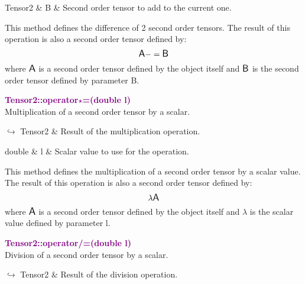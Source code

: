 \begin{tcolorbox}[width=\textwidth,myArgs,tabularx={ll|R}]
Tensor2 & B & Second order tensor to add to the current one.
\end{tcolorbox}

This method defines the difference of 2 second order tensors.
The result of this operation is also a second order tensor defined by:
\begin{equation*}
\mbox{\large\ensuremath{\mathsf{A}}} -= \mbox{\large\ensuremath{\mathsf{B}}}
\end{equation*}
where $\mbox{\large\ensuremath{\mathsf{A}}}$ is a second order tensor defined by the object itself and $\mbox{\large\ensuremath{\mathsf{B}}}$ is the second order tensor defined by parameter B.

\textcolor{purple}{\textbf{Tensor2::operator$\star$=(double l)}}\label{Tensor2::operator*=(double l)}\\
Multiplication of a second order tensor by a scalar.\vspace*{-0.5em}
\begin{tcolorbox}[grow to left by=-1cm, width=\textwidth-1cm,myArgs,tabularx={l|R}]
$\hookrightarrow$ Tensor2 & Result of the multiplication operation.
\end{tcolorbox}

\begin{tcolorbox}[width=\textwidth,myArgs,tabularx={ll|R}]
double & l & Scalar value to use for the operation.
\end{tcolorbox}

This method defines the multiplication of a second order tensor by a scalar value.
The result of this operation is also a second order tensor defined by:
\begin{equation*}
\lambda \mbox{\large\ensuremath{\mathsf{A}}}
\end{equation*}
where $\mbox{\large\ensuremath{\mathsf{A}}}$ is a second order tensor defined by the object itself and $\lambda$ is the scalar value defined by parameter l.

\textcolor{purple}{\textbf{Tensor2::operator/=(double l)}}\label{Tensor2::operator/=(double l)}\\
Division of a second order tensor by a scalar.\vspace*{-0.5em}
\begin{tcolorbox}[grow to left by=-1cm, width=\textwidth-1cm,myArgs,tabularx={l|R}]
$\hookrightarrow$ Tensor2 & Result of the division operation.
\end{tcolorbox}

